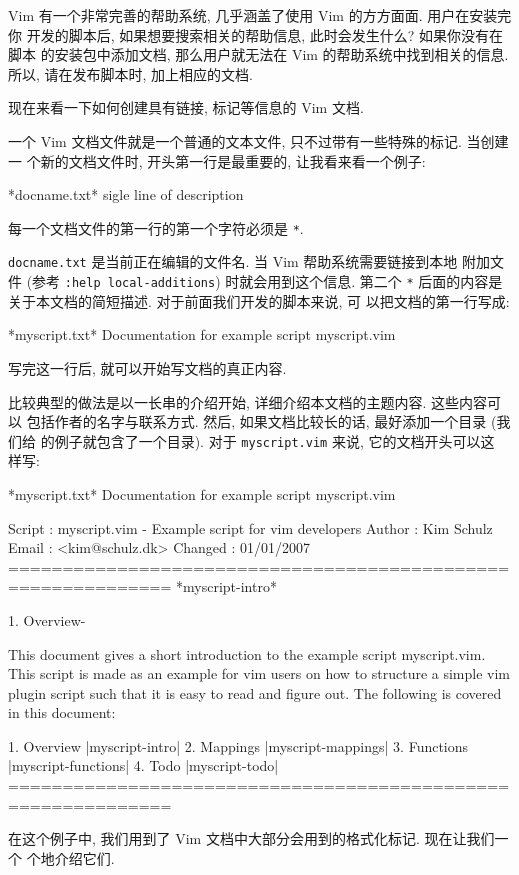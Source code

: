 Vim 有一个非常完善的帮助系统, 几乎涵盖了使用 Vim 的方方面面. 用户在安装完你
开发的脚本后, 如果想要搜索相关的帮助信息, 此时会发生什么? 如果你没有在脚本
的安装包中添加文档, 那么用户就无法在 Vim 的帮助系统中找到相关的信息. 所以,
请在发布脚本时, 加上相应的文档.

现在来看一下如何创建具有链接, 标记等信息的 Vim 文档.

一个 Vim 文档文件就是一个普通的文本文件, 只不过带有一些特殊的标记. 当创建一
个新的文档文件时, 开头第一行是最重要的, 让我看来看一个例子:
\begin{vimcode}
*docname.txt* sigle line of description
\end{vimcode}
每一个文档文件的第一行的第一个字符必须是 \texttt{*}.

\texttt{docname.txt} 是当前正在编辑的文件名. 当 Vim 帮助系统需要链接到本地
附加文件 (参考 \texttt{:help local-additions}) 时就会用到这个信息. 第二个
\texttt{*} 后面的内容是关于本文档的简短描述. 对于前面我们开发的脚本来说, 可
以把文档的第一行写成:
\begin{vimcode}
*myscript.txt* Documentation for example script myscript.vim
\end{vimcode}
写完这一行后, 就可以开始写文档的真正内容.

比较典型的做法是以一长串的介绍开始, 详细介绍本文档的主题内容. 这些内容可以
包括作者的名字与联系方式. 然后, 如果文档比较长的话, 最好添加一个目录 (我们给
的例子就包含了一个目录). 对于 \texttt{myscript.vim} 来说, 它的文档开头可以这
样写:
\begin{vimcode}
*myscript.txt* Documentation for example script myscript.vim

Script  : myscript.vim - Example script for vim developers
Author  : Kim Schulz
Email   : <kim@schulz.dk>
Changed : 01/01/2007
=============================================================
                                            *myscript-intro*

1. Overview-
\end{vimcode}
\begin{vimcode}
This document gives a short introduction to the example
script myscript.vim.
This script is made as an example for vim users on how to
structure a simple vim plugin script such that it is easy
to read and figure out.
The following is covered in this document:

    1. Overview					|myscript-intro|
	2. Mappings					|myscript-mappings|
	3. Functions				|myscript-functions|
	4. Todo						|myscript-todo|
=============================================================
\end{vimcode}
在这个例子中, 我们用到了 Vim 文档中大部分会用到的格式化标记. 现在让我们一个
个地介绍它们.

